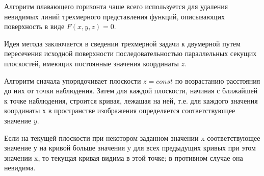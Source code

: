 
Алгоритм плавающего горизонта чаше всего используется для удаления невидимых линий трехмерного представления функций, описывающих поверхность в виде $F(x, y, z) = 0$.

Идея метода заключается в сведении трехмерной задачи к двумерной путем пересечения исходной поверхности последовательностью параллельных секущих плоскостей, имеющих постоянные значения координаты $z$.

Алгоритм сначала упорядочивает плоскости $z = const$ по возрастанию расстояния до них от точки наблюдения. Затем для каждой плоскости, начиная с ближайшей к точке наблюдения, строится кривая, лежащая на ней, т.е. для каждого значения координаты $х$ в пространстве изображения определяется соответствующее значение $y$.

Если на текущей плоскости при некотором заданном значении x соответствующее значение у на кривой больше значения y для всех предыдущих кривых при этом значении x, то текущая кривая видима в этой точке; в противном случае она невидима.~\cite{REMOVE_FACES}\\










